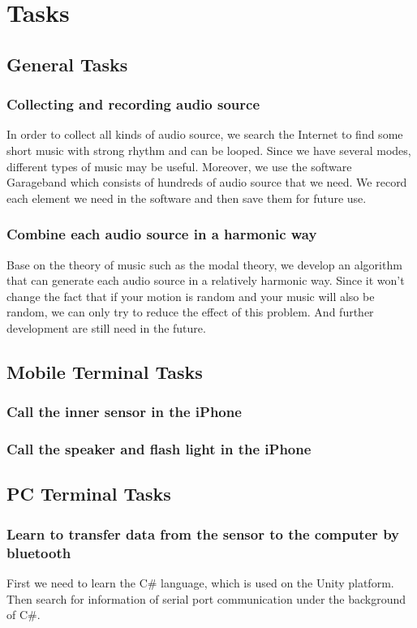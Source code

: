 \section{Tasks}
\subsection{General Tasks}
\subsubsection{Collecting and recording audio source}
In order to collect all kinds of audio source, we search the Internet to find some short music with strong rhythm and can be looped. Since we have several modes, different types of music may be useful. Moreover, we use the software Garageband which consists of hundreds of audio source that we need. We record each element we need in the software and then save them for future use.
\subsubsection{Combine each audio source in a harmonic way}
Base on the theory of music such as the modal theory, we develop an algorithm that can generate each audio source in a relatively harmonic way. Since it won’t change the fact that if your motion is random and your music will also be random, we can only try to reduce the effect of this problem. And further development are still need in the future. 
\subsection{Mobile Terminal Tasks}
\subsubsection{Call the inner sensor in the iPhone}
\subsubsection{Call the speaker and flash light in the iPhone}
\subsection{PC Terminal Tasks}
	\subsubsection{Learn to transfer data from the sensor to the computer by bluetooth}
	First we need to learn the C\# language, which is used on the Unity platform. Then search for information of serial port communication under the background of C\#. 
